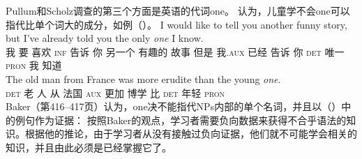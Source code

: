 Pullum和Scholz调查的第三个方面是英语的代词one。
 \citet[--425, 327--340]{Baker78a-u}认为，儿童学不会one可以指代比单个词大的成分，如例（）。
\eal
\ex 
\gll I would like to tell you another funny story, but I've already told you the only \emph{one} I
know.\\
我 要 喜欢 \textsc{inf} 告诉 你 另一个 有趣的 故事 但是 我.\textsc{aux} 已经 告诉 你 \textsc{det} 唯一 \textsc{pron} 我 知道\\
\ex 
\gll The old man from France was more erudite than the young \emph{one}.\\
\textsc{det} 老 人 从 法国 \textsc{aux} 更加 博学 比 \textsc{det} 年轻 \textsc{pron}\\
\zl
Baker（第416--417页）认为，one决不能指代NPs内部的单个名词，并且以（）中的例句作为证据：
\z
按照Baker的观点，学习者需要负向数据来获得不合乎语法的知识。根据他的推论，由于学习者从没有接触过负向证据，他们就不可能学会相关的知识，并且由此必须是已经掌握它了。


